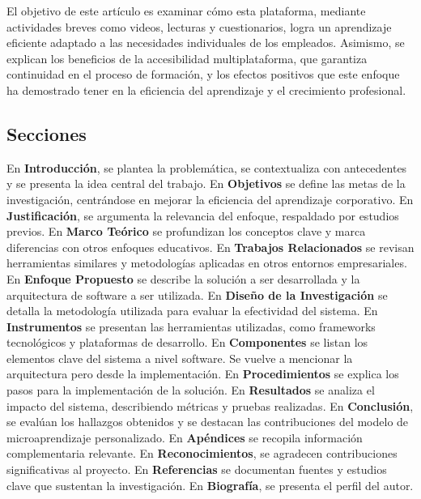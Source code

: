 El objetivo de este artículo es examinar cómo esta plataforma, mediante
actividades breves como videos, lecturas y cuestionarios, logra un aprendizaje
eficiente adaptado a las necesidades individuales de los empleados. Asimismo, se
explican los beneficios de la accesibilidad multiplataforma, que garantiza
continuidad en el proceso de formación, y los efectos positivos que este enfoque
ha demostrado tener en la eficiencia del aprendizaje y el crecimiento
profesional.

\subsection{Secciones}

En \textbf{Introducción}, se plantea la problemática, se contextualiza con antecedentes y se presenta la idea central del trabajo.
En \textbf{Objetivos} se define las metas de la investigación, centrándose en mejorar la eficiencia del aprendizaje corporativo.
En \textbf{Justificación}, se argumenta la relevancia del enfoque, respaldado por estudios previos.
En \textbf{Marco Teórico} se profundizan los conceptos clave y marca diferencias con otros enfoques educativos.
En \textbf{Trabajos Relacionados} se revisan herramientas similares y metodologías aplicadas en otros entornos empresariales.
En \textbf{Enfoque Propuesto} se describe la solución a ser desarrollada y la arquitectura de software a ser utilizada.
En \textbf{Diseño de la Investigación} se detalla la metodología utilizada para evaluar la efectividad del sistema.
En \textbf{Instrumentos} se presentan las herramientas utilizadas, como frameworks tecnológicos y plataformas de desarrollo.
En \textbf{Componentes} se listan los elementos clave del sistema a nivel software. Se vuelve a mencionar la arquitectura pero desde la implementación.
En \textbf{Procedimientos} se explica los pasos para la implementación de la solución.
En \textbf{Resultados} se analiza el impacto del sistema, describiendo métricas y pruebas realizadas.
En \textbf{Conclusión}, se evalúan los hallazgos obtenidos y se destacan las contribuciones del modelo de microaprendizaje personalizado.
En \textbf{Apéndices} se recopila información complementaria relevante.
En \textbf{Reconocimientos}, se agradecen contribuciones significativas al proyecto.
En \textbf{Referencias} se documentan fuentes y estudios clave que sustentan la investigación.
En \textbf{Biografía}, se presenta el perfil del autor.
